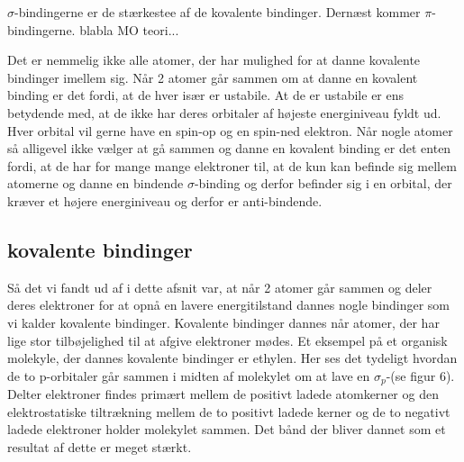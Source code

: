 \documentclass[12pt,a4paper]{article}
\theoremstyle{break}
\theoremstyle{nonumberplain}
\begin{document}
$\sigma$-bindingerne er de stærkestee af de kovalente bindinger. Dernæst kommer $\pi$-bindingerne. blabla MO teori...


Det er nemmelig ikke alle atomer, der har mulighed for at danne kovalente bindinger imellem sig. Når 2 atomer går sammen om at danne en kovalent binding er det fordi, at de hver især er ustabile. At de er ustabile er ens betydende med, at de ikke har deres orbitaler af højeste energiniveau fyldt ud. Hver orbital vil gerne have en spin-op og en spin-ned elektron. Når nogle atomer så alligevel ikke vælger at gå sammen og danne en kovalent binding er det enten fordi, at de har for mange mange elektroner til, at de kun kan befinde sig mellem atomerne og danne en bindende $\sigma$-binding og derfor befinder sig i en orbital, der kræver et højere energiniveau og derfor er anti-bindende. 

\subsection{kovalente bindinger}
Så det vi fandt ud af i dette afsnit var, at når 2 atomer går sammen og deler deres elektroner for at opnå en lavere energitilstand dannes nogle bindinger som vi kalder kovalente bindinger. Kovalente bindinger dannes når atomer, der har lige stor tilbøjelighed til at afgive elektroner mødes. Et eksempel på et organisk molekyle, der dannes kovalente bindinger er ethylen. Her ses det tydeligt hvordan de to p-orbitaler går sammen i midten af molekylet om at lave en $\sigma_p$-(se figur 6). Delter elektroner findes primært mellem de positivt ladede atomkerner og den elektrostatiske tiltrækning mellem de to positivt ladede kerner og de to negativt ladede elektroner holder molekylet sammen. Det bånd der bliver dannet som et resultat af dette er meget stærkt. 
\end{document}
